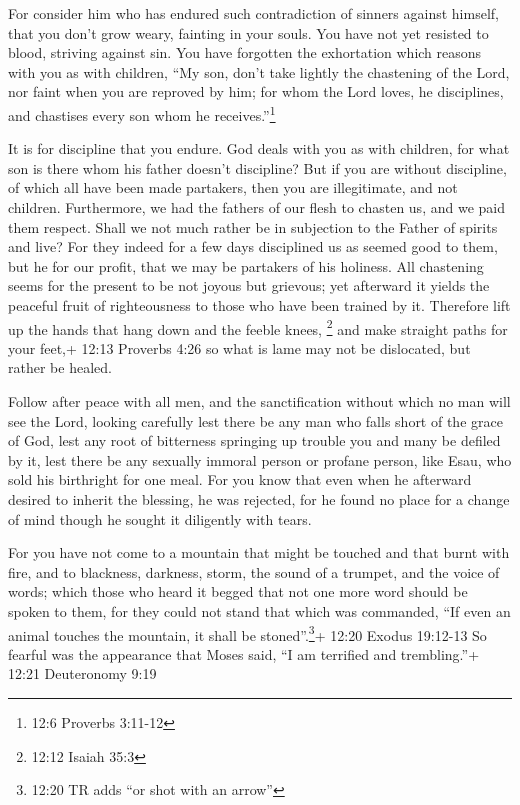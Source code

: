  For consider him who has endured such contradiction of
sinners against himself, that you don't grow weary, fainting in your
souls.  You have not yet resisted to blood, striving against
sin.  You have forgotten the exhortation which reasons with
you as with children, ``My son, don't take lightly the chastening of the
Lord, nor faint when you are reproved by him;  for whom the
Lord loves, he disciplines, and chastises every son whom he
receives.''\footnote{12:6 Proverbs 3:11-12}

 It is for discipline that you endure. God deals with you as
with children, for what son is there whom his father doesn't discipline?
 But if you are without discipline, of which all have been
made partakers, then you are illegitimate, and not children.
 Furthermore, we had the fathers of our flesh to chasten us,
and we paid them respect. Shall we not much rather be in subjection to
the Father of spirits and live?  For they indeed for a few
days disciplined us as seemed good to them, but he for our profit, that
we may be partakers of his holiness.  All chastening seems
for the present to be not joyous but grievous; yet afterward it yields
the peaceful fruit of righteousness to those who have been trained by
it.  Therefore lift up the hands that hang down and the
feeble knees, \footnote{12:12 Isaiah 35:3}  and make
straight paths for your feet,+ 12:13 Proverbs 4:26 so what is lame may
not be dislocated, but rather be healed.

 Follow after peace with all men, and the sanctification
without which no man will see the Lord,  looking carefully
lest there be any man who falls short of the grace of God, lest any root
of bitterness springing up trouble you and many be defiled by it,
 lest there be any sexually immoral person or profane
person, like Esau, who sold his birthright for one meal. 
For you know that even when he afterward desired to inherit the
blessing, he was rejected, for he found no place for a change of mind
though he sought it diligently with tears.

 For you have not come to a mountain that might be touched
and that burnt with fire, and to blackness, darkness, storm,
 the sound of a trumpet, and the voice of words; which
those who heard it begged that not one more word should be spoken to
them,  for they could not stand that which was commanded,
``If even an animal touches the mountain, it shall be
stoned''.\footnote{12:20 TR adds ``or shot with an arrow''}+ 12:20
Exodus 19:12-13  So fearful was the appearance that Moses
said, ``I am terrified and trembling.''+ 12:21 Deuteronomy 9:19

